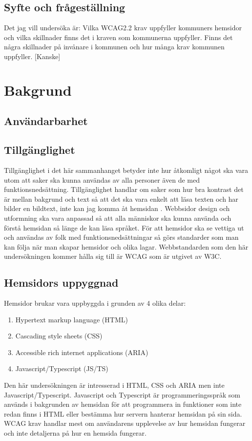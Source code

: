 \documentclass[11p]{article}
\begin{document}
    \subsection{Syfte och frågeställning}
    Det jag vill undersöka är:
    Vilka WCAG2.2 krav uppfyller kommuners hemsidor och vilka skillnader finns det i kraven som kommunerna uppfyller.
    Finns det några skillnader på invånare i kommunen och hur många krav kommunen uppfyller. [Kanske]

    \section{Bakgrund}

    \subsection{Användarbarhet}

    \subsection{Tillgänglighet}
    Tillgänglighet i det här sammanhanget betyder inte hur åtkomligt något ska vara utom att saker ska kunna användas av alla personer även de med funktionsnedsättning.
    Tillgänglighet handlar om saker som hur bra kontrast det är mellan bakgrund och text så att det ska vara enkelt att läsa texten och har bilder en bildtext, inte kan jag komma åt hemsidan \parencite{webbriktlinjer}.
    Webbsidor design och utformning ska vara anpassad så att alla människor ska kunna använda och förstå hemsidan så länge de kan läsa språket.
    För att hemsidor ska se vettiga ut och användas av folk med funktionsnedsättningar så görs standarder som man kan följa när man skapar hemsidor och olika lagar.
    Webbstandarden som den här undersökningen kommer hålla sig till är WCAG som är utgivet av W3C.


    \subsection{Hemsidors uppyggnad}
    Hemsidor brukar vara uppbyggda i grunden av 4 olika delar:
    \begin{enumerate}
        \item Hypertext markup language (HTML)
        \item Cascading style sheets (CSS)
        \item Accessible rich internet applications (ARIA)
        \item Javascript/Typescript (JS/TS)
    \end{enumerate}
    Den här undersökningen är intresserad i HTML, CSS och ARIA men inte Javascript/Typescript.
    Javascript och Typescript är programmeringsspråk som används i bakgrunden av hemsidan för att programmera in funktioner som inte redan finns i HTML eller bestämma hur servern hanterar hemsidan på sin sida.
    WCAG krav handlar mest om användarens upplevelse av hur hemsidan fungerar och inte detaljerna på hur en hemsida fungerar.
\end{document}
